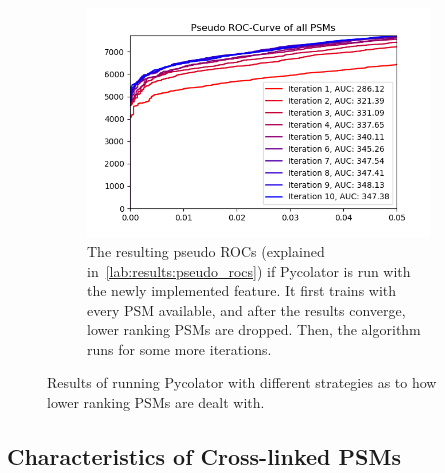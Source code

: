 \begin{figure}
\begin{subfigure}{0.49\textwidth}
		\label{fig:only_rank_one}
	\end{subfigure}
	\begin{subfigure}{0.75\textwidth}
		\includegraphics[width = \textwidth]{figures/optimalRanking.png}
		\caption[Result of the new ranking procedure]{The resulting pseudo ROCs (explained in~\ref{lab:results:pseudo_rocs}) if Pycolator is run with the newly implemented feature. It first trains with every PSM available, and after the results converge, lower ranking PSMs are dropped. Then, the algorithm runs for some more iterations.}
		\label{fig:optimalranking}
	\end{subfigure}
	\caption[Results of strategies regarding different ranks]{Results of running Pycolator with different strategies as to how lower ranking PSMs are dealt with.}
	\label{fig:before_optimalranking}
\end{figure}
\renewcommand{\baselinestretch}{1}

\subsection{Characteristics of Cross-linked PSMs}
